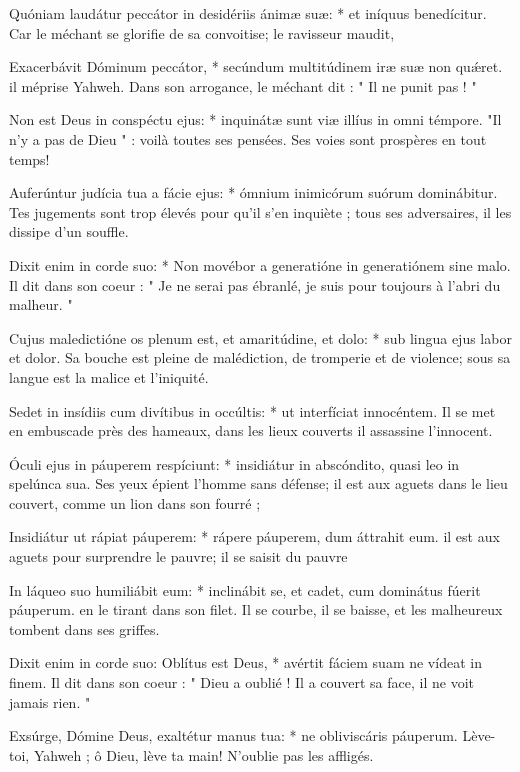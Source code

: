 \begin{paracol}{2}
\LigneParacol
{Quóniam laudátur peccátor in desidériis ánimæ suæ: * et iníquus benedícitur.}
{Car le méchant se glorifie de sa convoitise; le ravisseur maudit,}

\LigneParacol
{Exacerbávit Dóminum peccátor, * secúndum multitúdinem iræ suæ non quǽret.}
{il méprise Yahweh. Dans son arrogance, le méchant dit : " Il ne punit pas ! "}

\LigneParacol
{Non est Deus in conspéctu ejus: * inquinátæ sunt viæ illíus in omni témpore.}
{"Il n'y a pas de Dieu " : voilà toutes ses pensées. Ses voies sont prospères en tout temps!}

\LigneParacol
{Auferúntur judícia tua a fácie ejus: * ómnium inimicórum suórum dominábitur.}
{Tes jugements sont trop élevés pour qu'il s'en inquiète ; tous ses adversaires, il les dissipe d'un souffle. }

\LigneParacol
{Dixit enim in corde suo: * Non movébor a generatióne in generatiónem sine malo.}
{Il dit dans son coeur : " Je ne serai pas ébranlé, je suis pour toujours à l'abri du malheur. " }

\LigneParacol
{Cujus maledictióne os plenum est, et amaritúdine, et dolo: * sub lingua ejus labor et dolor.}
{Sa bouche est pleine de malédiction, de tromperie et de violence; sous sa langue est la malice et l'iniquité. }

\LigneParacol
{Sedet in insídiis cum divítibus in occúltis: * ut interfíciat innocéntem.}
{Il se met en embuscade près des hameaux, dans les lieux couverts il assassine l'innocent.}

\LigneParacol
{Óculi ejus in páuperem respíciunt: * insidiátur in abscóndito, quasi leo in spelúnca sua.}
{Ses yeux épient l'homme sans défense; il est aux aguets dans le lieu couvert, comme un lion dans son fourré ;}

\LigneParacol
{Insidiátur ut rápiat páuperem: * rápere páuperem, dum áttrahit eum.}
{il est aux aguets pour surprendre le pauvre; il se saisit du pauvre}

\LigneParacol
{In láqueo suo humiliábit eum: * inclinábit se, et cadet, cum dominátus fúerit páuperum.}
{en le tirant dans son filet. Il se courbe, il se baisse, et les malheureux tombent dans ses griffes. }

\LigneParacol
{Dixit enim in corde suo: Oblítus est Deus, * avértit fáciem suam ne vídeat in finem.}
{Il dit dans son coeur : " Dieu a oublié ! Il a couvert sa face, il ne voit jamais rien. " }

\LigneParacol
{Exsúrge, Dómine Deus, exaltétur manus tua: * ne obliviscáris páuperum.}
{Lève-toi, Yahweh ; ô Dieu, lève ta main! N'oublie pas les affligés. }


\end{paracol}
